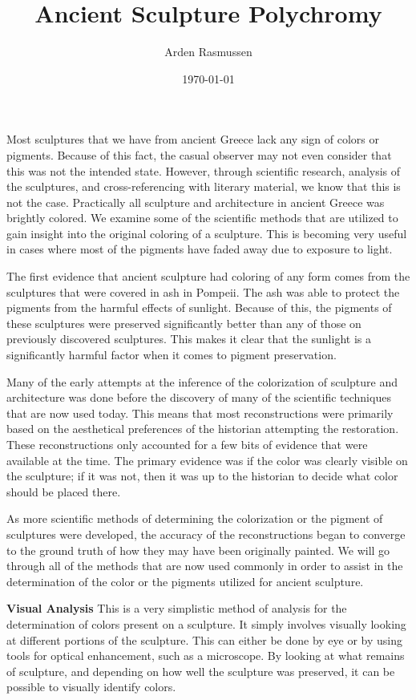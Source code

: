 \documentclass[10pt]{armath}
\title{Ancient Sculpture Polychromy}
\author{Arden Rasmussen}
\date{\today}
\begin{document}
\maketitle

Most sculptures that we have from ancient Greece lack any sign of colors or
pigments. Because of this fact, the casual observer may not even consider that
this was not the intended state. However, through scientific research, analysis
of the sculptures, and cross-referencing with literary material, we know that
this is not the case.  Practically all sculpture and architecture in ancient
Greece was brightly colored. We examine some of the scientific methods that are
utilized to gain insight into the original coloring of a sculpture. This is
becoming very useful in cases where most of the pigments have faded away due to
exposure to light.

The first evidence that ancient sculpture had coloring of any form comes from
the sculptures that were covered in ash in Pompeii. The ash was able to protect
the pigments from the harmful effects of sunlight. Because of this, the
pigments of these sculptures were preserved significantly better than any of
those on previously discovered sculptures. This makes it clear that the
sunlight is a significantly harmful factor when it comes to pigment
preservation.

Many of the early attempts at the inference of the colorization of sculpture
and architecture was done before the discovery of many of the scientific
techniques that are now used today. This means that most reconstructions were
primarily based on the aesthetical preferences of the historian attempting the
restoration. These reconstructions only accounted for a few bits of evidence
that were available at the time. The primary evidence was if the color was
clearly visible on the sculpture; if it was not, then it was up to the
historian to decide what color should be placed there.

As more scientific methods of determining the colorization or the pigment of
sculptures were developed, the accuracy of the reconstructions began to
converge to the ground truth of how they may have been originally painted. We
will go through all of the methods that are now used commonly in order to
assist in the determination of the color or the pigments utilized for ancient
sculpture.

\textbf{Visual Analysis} This is a very simplistic method of analysis for the
determination of colors present on a sculpture. It simply involves visually
looking at different portions of the sculpture. This can either be done by eye
or by using tools for optical enhancement, such as a microscope. By looking at
what remains of sculpture, and depending on how well the sculpture was
preserved, it can be possible to visually identify colors.
\end{document}
